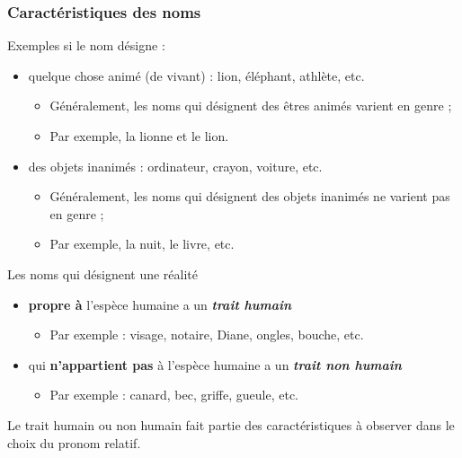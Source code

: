 \documentclass[10pt, french]{article}
\begin{document}
\begin{multicols*}{2}
\subsubsection*{Caractéristiques des noms}
\begin{definitionNOHFILLpropos}
Exemples si le nom désigne :
\begin{itemize}
	\item	quelque chose animé (de vivant) : lion, éléphant, athlète, etc.
		\begin{itemize}
		\item	Généralement, les noms qui désignent des êtres animés varient en genre ;
		\item	Par exemple, la lionne et le lion.
		\end{itemize}
	\item	des objets inanimés : ordinateur, crayon, voiture, etc.
		\begin{itemize}
		\item	Généralement, les noms qui désignent des objets inanimés ne varient pas en genre ;
		\item	Par exemple, la nuit, le livre, etc.
		\end{itemize}
\end{itemize}
\end{definitionNOHFILLpropos}


\begin{definitionNOHFILLpropos}
Les noms qui désignent une réalité
\begin{itemize}
	\item	\textbf{propre à} l'espèce humaine a un \textbf{\textit{trait humain}}
		\begin{itemize}
		\item	Par exemple : visage, notaire, Diane, ongles, bouche, etc.
		\end{itemize}
	\item	qui \textbf{n'appartient pas} à l'espèce humaine a un \textbf{\textit{trait non humain}}
		\begin{itemize}
		\item	Par exemple : canard, bec, griffe, gueule, etc.
		\end{itemize}
\end{itemize}
\begin{astuces}[Astuce]
Le trait humain ou non humain fait partie des caractéristiques à observer dans le choix du pronom relatif.
\end{astuces}
\end{definitionNOHFILLpropos}



\end{multicols*}
\end{document}
